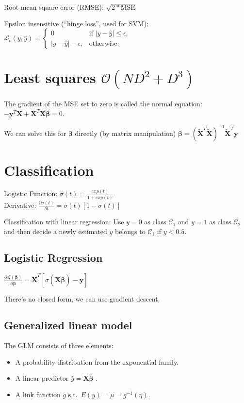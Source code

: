 \documentclass[10pt,a4paper,landscape]{article}
\renewcommand{\bf}[1]{\ensuremath{\mathbf{#1}}}
\newcommand{\bbeta}{\boldsymbol\beta}
\newcommand{\st}{s.t.}
\begin{document}
\begin{multicols*}{4}
Root mean square error (RMSE): $\sqrt{2 * \text{MSE}}$

Epsilon insensitive (``hinge loss'', used for SVM):
$\mathcal{L}_{\epsilon}(y, \hat{y}) = \begin{cases}
0                   & \text{if } |y - \hat y| \le \epsilon, \\
|y - \hat y| - \epsilon, & \text{otherwise.}
\end{cases}$

\section{Least squares \small$\mathcal{O}(ND^2 + D^3)$}
The gradient of the MSE set to zero is called the normal equation:
$ - \bf{y}^T \bf{X} + \bf{X}^T \bf{X} \bbeta = 0$.

We can solve this for $\bbeta$ directly (by matrix manipulation)
$\bbeta = ( \bf{\tilde{X}}^T \bf{\tilde{X}} )^{-1} \bf{\tilde{X}}^T \bf{y}$

\section{Classification}
Logistic Function: $\sigma(t) = \frac{exp(t)}{1+exp(t)}$\\
Derivative: $\frac{ \partial\sigma(t) }{ \partial t } = \sigma(t)[ 1 - \sigma(t) ]$

Classification with linear regression: Use $y = 0$ as class $\mathcal{C}_1$
and $y = 1$ as class $\mathcal{C}_2$ and then decide a newly estimated $y$ belongs
to $\mathcal{C}_1$ if $y < 0.5$.

\subsection{Logistic Regression}
$\frac{ \partial\mathcal{L}(\bbeta) }{ \partial \bbeta } = \tilde{\bf{X}}^T [\sigma(\tilde{\bf{X}} \bbeta) - \bf{y}]$

There's no closed form, we can use gradient descent.

\subsection{Generalized linear model}
The GLM consists of three elements:
\begin{itemize}
  \item A probability distribution from the exponential family.
  \item A linear predictor $\hat y = \bf{X} \bbeta$ .
  \item A link function $g$ \st\ $E(y) = \mu = g^{-1}(\eta)$.
\end{itemize}


\end{multicols*}
\end{document}
